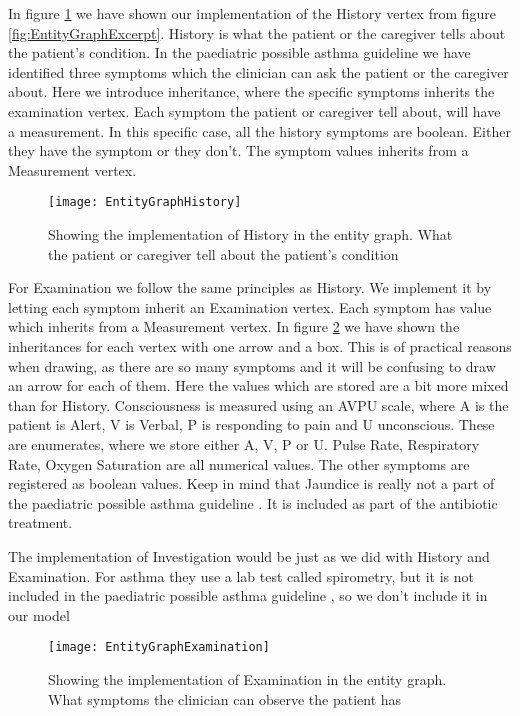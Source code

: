 In figure \ref{fig:EntityGraphHistory} we have shown our implementation of the History vertex from figure \ref{fig:EntityGraphExcerpt}. History is what the patient or the caregiver tells about the patient's condition. In the paediatric possible asthma guideline \parencite{RepublicofKeny2016} we have identified three symptoms which the clinician can ask the patient or the caregiver about. Here we introduce inheritance, where the specific symptoms inherits the examination vertex. Each symptom the patient or caregiver tell about, will have a measurement. In this specific case, all the history symptoms are boolean. Either they have the symptom or they don't. The symptom values inherits from a Measurement vertex.

\begin{figure}[h!]
	\texttt{[image: EntityGraphHistory]}
	\caption {Showing the implementation of History in the entity graph. What the patient or caregiver tell about the patient's condition}
		\label{fig:EntityGraphHistory}
\end{figure}

For Examination we follow the same principles as History. We implement it by letting each symptom inherit an Examination vertex. Each symptom has value which inherits from a Measurement vertex. In figure \ref{fig:EntityGraphExamination} we have shown the inheritances for each vertex with one arrow and a box. This is of practical reasons when drawing, as there are so many symptoms and it will be confusing to draw an arrow for each of them. Here the values which are stored are a bit more mixed than for History. Consciousness is measured using an AVPU scale, where A is the patient is Alert, V is Verbal, P is responding to pain and U unconscious. These are enumerates, where we store either A, V, P or U. Pulse Rate, Respiratory Rate, Oxygen Saturation are all numerical values. The other symptoms are registered as boolean values. Keep in mind that Jaundice is really not a part of the paediatric possible asthma guideline \parencite{RepublicofKeny2016}. It is included as part of the antibiotic treatment.


The implementation of Investigation would be just as we did with History and Examination. For asthma they use a lab test called spirometry, but it is not included in the paediatric possible asthma guideline \parencite{RepublicofKeny2016}, so we don't include it in our model

\begin{figure}[h!]
	\texttt{[image: EntityGraphExamination]}
	\caption {Showing the implementation of Examination in the entity graph. What symptoms the clinician can observe the patient has}
	\label{fig:EntityGraphExamination}
\end{figure}

